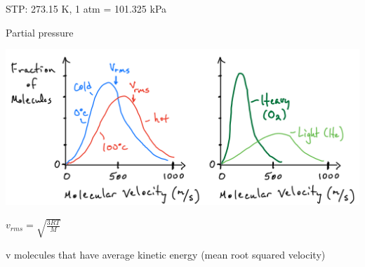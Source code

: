 \documentclass[ wastespaceontitle, english]{cheat_sheet_template}
\begin{document}
    STP: 273.15 K, 1 atm = 101.325 kPa
    
    Partial pressure 
    
    \begin{minipage}{0.69\linewidth}
    \includegraphics[width=1\linewidth]{pictures/Distrubution_velocity.png}
    \end{minipage}
    \begin{minipage}{0.3\linewidth}
        $v_{rms} = \sqrt{\frac{3 R T}{M}}$ 
        
        v molecules that have average kinetic energy (mean root squared velocity)
        
    \end{minipage}
    
\end{document}
